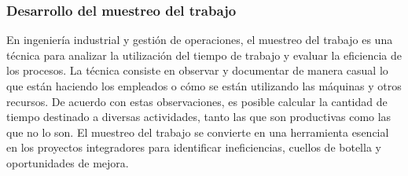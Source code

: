 \subsubsection{Desarrollo del muestreo del trabajo}
% 
En ingeniería industrial y gestión de operaciones, el muestreo del trabajo es una técnica para analizar la utilización del tiempo de trabajo y evaluar la eficiencia de los procesos. La técnica consiste en observar y documentar de manera casual lo que están haciendo los empleados o cómo se están utilizando las máquinas y otros recursos. De acuerdo con estas observaciones, es posible calcular la cantidad de tiempo destinado a diversas actividades, tanto las que son productivas como las que no lo son. El muestreo del trabajo se convierte en una herramienta esencial en los proyectos integradores para identificar ineficiencias, cuellos de botella y oportunidades de mejora.
